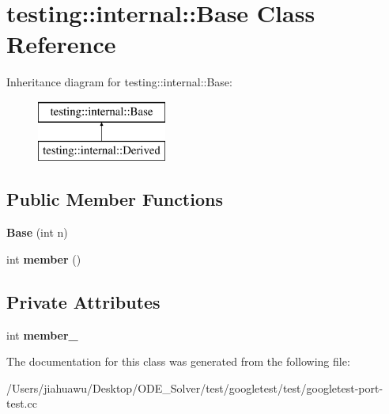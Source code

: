 \hypertarget{classtesting_1_1internal_1_1_base}{}\section{testing\+:\+:internal\+:\+:Base Class Reference}
\label{classtesting_1_1internal_1_1_base}
Inheritance diagram for testing\+:\+:internal\+:\+:Base\+:\begin{figure}[H]
\begin{center}
\leavevmode
\includegraphics[height=2.000000cm]{classtesting_1_1internal_1_1_base}
\end{center}
\end{figure}
\subsection*{Public Member Functions}
\begin{DoxyCompactItemize}
\item 
\mbox{\label{classtesting_1_1internal_1_1_base_a255d105410a1eeb5f4690c9c8cd8e104}} 
{\bfseries Base} (int n)
\item 
\mbox{\label{classtesting_1_1internal_1_1_base_a7ddba6221b56613be545544b7ef6214c}} 
int {\bfseries member} ()
\end{DoxyCompactItemize}
\subsection*{Private Attributes}
\begin{DoxyCompactItemize}
\item 
\mbox{\label{classtesting_1_1internal_1_1_base_ae5ef293660377de27d63ad79b35d2e81}} 
int {\bfseries member\+\_\+}
\end{DoxyCompactItemize}


The documentation for this class was generated from the following file\+:\begin{DoxyCompactItemize}
\item 
/\+Users/jiahuawu/\+Desktop/\+O\+D\+E\+\_\+\+Solver/test/googletest/test/googletest-\/port-\/test.\+cc\end{DoxyCompactItemize}
